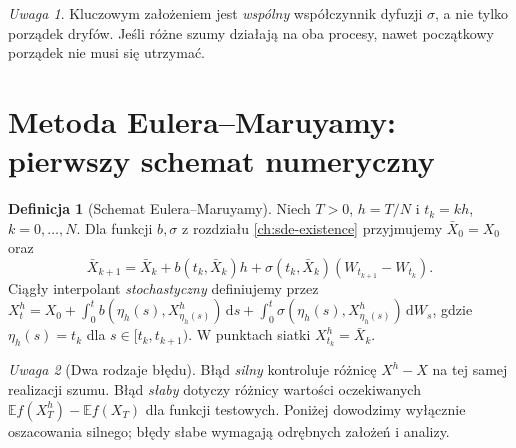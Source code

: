 \documentclass[11pt,a4paper,oneside]{report}
\numberwithin{equation}{chapter}
\theoremstyle{plain}
\theoremstyle{definition}
\newtheorem{definicja}{Definicja}[chapter]
\theoremstyle{remark}
\newtheorem{uwaga}{Uwaga}[chapter]
\newcommand{\E}{\mathbb{E}}
\newcommand{\dd}{\mathrm{d}}
\begin{document}
\begin{uwaga}
Kluczowym założeniem jest \emph{wspólny} współczynnik
dyfuzji $\sigma$, a nie tylko porządek dryfów.
Jeśli różne szumy działają na oba procesy, nawet
początkowy porządek nie musi się utrzymać.
\end{uwaga}

\section{Metoda Eulera--Maruyamy: pierwszy schemat numeryczny}\label{sec:volIII:06:06}
\begin{definicja}[Schemat Eulera--Maruyamy]\label{def:volIII:06:03}
\label{def:em}
Niech $T>0$, $h=T/N$ i $t_k=kh$, $k=0,\ldots,N$.
Dla funkcji $b,\sigma$ z rozdziału
\ref{ch:sde-existence} przyjmujemy
$\bar X_0=X_0$ oraz
\[
\bar X_{k+1}=\bar X_k+b(t_k,\bar X_k)h
+\sigma(t_k,\bar X_k)(W_{t_{k+1}}-W_{t_k}).
\tag{6.11}\label{eq:em}
\]
Ciągły interpolant \emph{stochastyczny} definiujemy
przez $X_t^h=X_0+\int_0^t b(\eta_h(s),X^h_{\eta_h(s)})\,\dd s
+\int_0^t\sigma(\eta_h(s),X^h_{\eta_h(s)})\,\dd W_s$,
gdzie $\eta_h(s)=t_k$ dla $s\in[t_k,t_{k+1})$.
W punktach siatki $X_{t_k}^h=\bar X_k$.
\end{definicja}

\begin{uwaga}[Dwa rodzaje błędu]
Błąd \emph{silny} kontroluje różnicę $X^h-X$
na tej samej realizacji szumu. Błąd \emph{słaby}
dotyczy różnicy wartości oczekiwanych
$\E f(X_T^h)-\E f(X_T)$ dla funkcji testowych.
Poniżej dowodzimy wyłącznie oszacowania silnego;
błędy słabe wymagają odrębnych założeń i analizy.
\end{uwaga}
\end{document}
